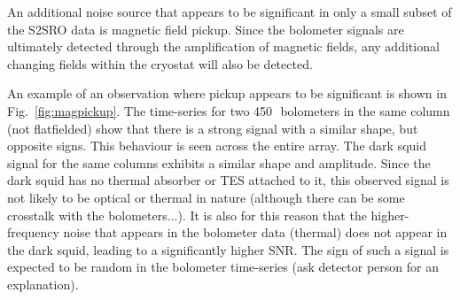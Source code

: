 \documentclass[useAMS,usenatbib,nofootinbib]{mn2e}
\newcommand{\snr}{SNR}
\begin{document}
An additional noise source that appears to be significant in only a
small subset of the S2SRO data is magnetic field pickup. Since the
bolometer signals are ultimately detected through the amplification of
magnetic fields, any additional changing fields within the cryostat
will also be detected.

An example of an observation where pickup appears to be significant is
shown in Fig.~\ref{fig:magpickup}. The time-series for two
450\,\micron\ bolometers in the same column (not flatfielded) show
that there is a strong signal with a similar shape, but opposite
signs. This behaviour is seen across the entire array. The dark squid
signal for the same columns exhibits a similar shape and
amplitude. Since the dark squid has no thermal absorber or TES
attached to it, this observed signal is not likely to be optical or
thermal in nature (although there can be some crosstalk with the
bolometers...). It is also for this reason that the higher-frequency
noise that appears in the bolometer data (thermal) does not appear in
the dark squid, leading to a significantly higher \snr. The sign of
such a signal is expected to be random in the bolometer time-series
(ask detector person for an explanation).
\end{document}
